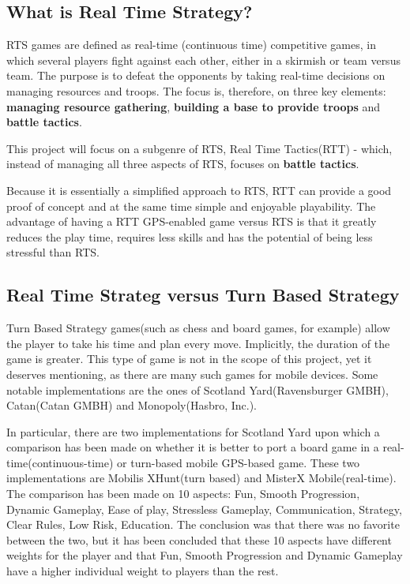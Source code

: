 \documentclass{article}
\begin{document}
\subsection{What is Real Time Strategy?}

RTS games are defined as real-time (continuous time) competitive games, in which
several players fight against each other, either in a skirmish or team versus
team. The purpose is to defeat the opponents by taking real-time decisions on
managing resources and troops. The focus is, therefore, on three key elements:
\textbf{managing resource gathering}, \textbf{building a base to provide troops}
and \textbf{battle tactics}.\cite{rts}\newline

This project will focus on a subgenre of RTS, Real Time Tactics(RTT) - which,
instead of managing all three aspects of RTS, focuses on \textbf{battle
tactics}.\newline

Because it is essentially a simplified approach to RTS\cite{rttvsrts}, RTT can
provide a good proof of concept and at the same time simple and enjoyable
playability. The advantage of having a RTT GPS-enabled game versus RTS is that
it greatly reduces the play time, requires less skills and has the potential of
being less stressful than RTS.\newline

\subsection{Real Time Strateg versus Turn Based Strategy}

Turn Based Strategy games\cite{rtsvstbs}(such as chess and board
games, for example) allow the player to take his time and plan every move.
Implicitly, the duration of the game is greater. This type of game is not in the
scope of this project, yet it deserves mentioning, as there are many such games
for mobile devices. Some notable implementations are the ones of Scotland
Yard(Ravensburger GMBH), Catan(Catan GMBH) and Monopoly(Hasbro, Inc.).\newline

In particular, there are two implementations for Scotland Yard upon which a
comparison has been made on whether it is better to port a board game in a
real-time(continuous-time) or turn-based mobile GPS-based game\cite{rttvsrts2}.
These two implementations are Mobilis XHunt(turn based) and MisterX
Mobile(real-time). The comparison has been made on 10 aspects: Fun, Smooth
Progression, Dynamic Gameplay, Ease of play, Stressless Gameplay, Communication,
Strategy, Clear Rules, Low Risk, Education. The conclusion was that there was no
favorite between the two, but it has been concluded that these 10 aspects have
different weights for the player and that Fun, Smooth Progression and Dynamic
Gameplay have a higher individual weight to players than the
rest.\cite[p. 5]{rttvsrts2}\newline
\end{document}
